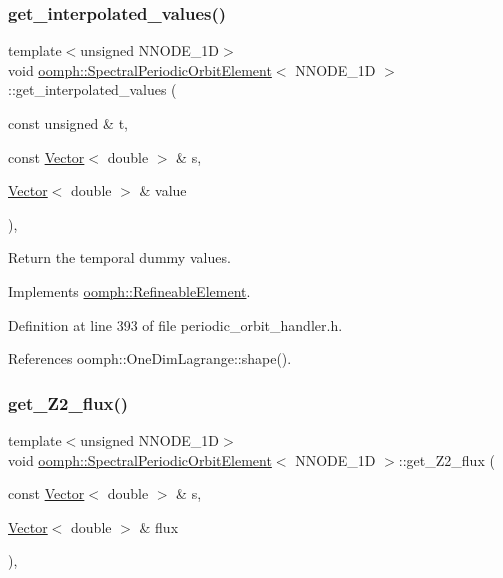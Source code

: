 \subsubsection{\texorpdfstring{get\+\_\+interpolated\+\_\+values()}{get\_interpolated\_values()}\hspace{0.1cm}{\footnotesize\ttfamily [2/2]}}
{\footnotesize\ttfamily template$<$unsigned N\+N\+O\+D\+E\+\_\+1D$>$ \\
void \hyperlink{classoomph_1_1SpectralPeriodicOrbitElement}{oomph\+::\+Spectral\+Periodic\+Orbit\+Element}$<$ N\+N\+O\+D\+E\+\_\+1D $>$\+::get\+\_\+interpolated\+\_\+values (\begin{DoxyParamCaption}\item[{const unsigned \&}]{t,  }\item[{const \hyperlink{classoomph_1_1Vector}{Vector}$<$ double $>$ \&}]{s,  }\item[{\hyperlink{classoomph_1_1Vector}{Vector}$<$ double $>$ \&}]{value }\end{DoxyParamCaption})\hspace{0.3cm}{\ttfamily [inline]}, {\ttfamily [virtual]}}



Return the temporal dummy values. 



Implements \hyperlink{classoomph_1_1RefineableElement_ada6f0efe831ffefb1d2829ce01d45bfc}{oomph\+::\+Refineable\+Element}.



Definition at line 393 of file periodic\+\_\+orbit\+\_\+handler.\+h.



References oomph\+::\+One\+Dim\+Lagrange\+::shape().

\mbox{\label{classoomph_1_1SpectralPeriodicOrbitElement_aee2d7222e52f4d59692b8f1ac3964b17}} 
\subsubsection{\texorpdfstring{get\+\_\+\+Z2\+\_\+flux()}{get\_Z2\_flux()}}
{\footnotesize\ttfamily template$<$unsigned N\+N\+O\+D\+E\+\_\+1D$>$ \\
void \hyperlink{classoomph_1_1SpectralPeriodicOrbitElement}{oomph\+::\+Spectral\+Periodic\+Orbit\+Element}$<$ N\+N\+O\+D\+E\+\_\+1D $>$\+::get\+\_\+\+Z2\+\_\+flux (\begin{DoxyParamCaption}\item[{const \hyperlink{classoomph_1_1Vector}{Vector}$<$ double $>$ \&}]{s,  }\item[{\hyperlink{classoomph_1_1Vector}{Vector}$<$ double $>$ \&}]{flux }\end{DoxyParamCaption})\hspace{0.3cm}{\ttfamily [inline]}, {\ttfamily [virtual]}}



